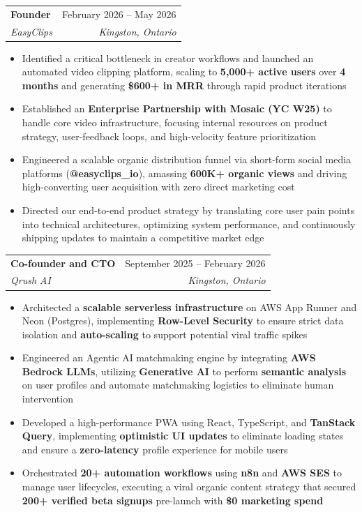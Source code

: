 \documentclass[letterpaper,11pt]{article}
\makeatletter
\newcommand{\resumeItem}[1]{
  \item\small{
    {#1 \vspace{-2pt}}
  }
}
\newcommand{\resumeSubheading}[4]{
  \vspace{-2pt}\item
    \begin{tabular*}{0.97\textwidth}[t]{l@{\extracolsep{\fill}}r}
      \textbf{#1} & #2 \\
      \textit{\small#3} & \textit{\small #4} \\
    \end{tabular*}\vspace{-7pt}
}
\newcommand{\resumeItemListStart}{\begin{itemize}}
\newcommand{\resumeItemListEnd}{\end{itemize}\vspace{-5pt}}
\makeatother
\begin{document}
    \resumeSubheading
      {Founder}{February 2026 -- May 2026}
      {EasyClips}{Kingston, Ontario}
      \resumeItemListStart
        \resumeItem{Identified a critical bottleneck in creator workflows and launched an automated video clipping platform, scaling to \textbf{5,000+ active users} over \textbf{4 months} and generating \textbf{\$600+ in MRR} through rapid product iterations}
        \resumeItem{Established an \textbf{Enterprise Partnership with Mosaic (YC W25)} to handle core video infrastructure, focusing internal resources on product strategy, user-feedback loops, and high-velocity feature prioritization}
        \resumeItem{Engineered a scalable organic distribution funnel via short-form social media platforms (\textbf{@easyclips\_io}), amassing \textbf{600K+ organic views} and driving high-converting user acquisition with zero direct marketing cost}
        \resumeItem{Directed our end-to-end product strategy by translating core user pain points into technical architectures, optimizing system performance, and continuously shipping updates to maintain a competitive market edge}
      \resumeItemListEnd

      \resumeSubheading
      {Co-founder and CTO}{September 2025 --  February 2026}
      {Qrush AI}{Kingston, Ontario}
      \resumeItemListStart
        \resumeItem{Architected a \textbf{scalable serverless infrastructure} on AWS App Runner and Neon (Postgres), implementing \textbf{Row-Level Security} to ensure strict data isolation and \textbf{auto-scaling} to support potential viral traffic spikes}
        \resumeItem{Engineered an Agentic AI matchmaking engine by integrating \textbf{AWS Bedrock LLMs}, utilizing \textbf{Generative AI} to perform \textbf{semantic analysis} on user profiles and automate matchmaking logistics to eliminate human intervention}
        \resumeItem{Developed a high-performance PWA using React, TypeScript, and \textbf{TanStack Query}, implementing \textbf{optimistic UI updates} to eliminate loading states and ensure a \textbf{zero-latency} profile experience for mobile users}
        \resumeItem{Orchestrated \textbf{20+ automation workflows} using \textbf{n8n} and \textbf{AWS SES} to manage user lifecycles, executing a viral organic content strategy that secured \textbf{200+ verified beta signups} pre-launch with \textbf{\$0 marketing spend}}
      \resumeItemListEnd
\end{document}
